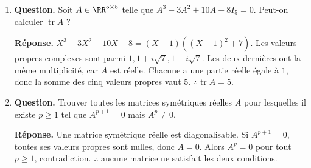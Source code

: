 \documentclass[12pt, a4paper]{article}
\begin{document}
\begin{enumerate}[label=9.\arabic*., start=94]
\begin{minipage}[t]{\linewidth}
\begin{enumerate}[\arabic*.]
$A^2=\beta^2I_n+(n+2\beta)J$ et
        \[
          A^4=\beta^4I_n+(n+2\beta)(n^2+2n\beta+2\beta^2)J
        \]

  \item \textbf{Question.} $A$ est-elle diagonalisable ?
\par\smallskip
\textbf{Réponse.} $A$ est symétrique réelle, donc toujours diagonalisable orthogonalement.
        Sur $\RR\boldsymbol1$, la valeur propre est $n+\beta$ ; sur $\boldsymbol1^\perp$, $A=\beta R$ et les valeurs propres possibles sont $\pm\beta$.

\end{enumerate}
\end{minipage}

  \item \begin{minipage}[t]{\linewidth}\raggedright
\textbf{Question.} Soit $A\in\RR^{5\times5}$ telle que $A^3-3A^2+10A-8I_5=0$. Peut-on calculer $\operatorname{tr}A$ ?
\par\smallskip
\textbf{Réponse.} $X^3-3X^2+10X-8=(X-1)((X-1)^2+7)$.
    Les valeurs propres complexes sont parmi $1,1+i\sqrt7,1-i\sqrt7$.
    Les deux dernières ont la même multiplicité, car $A$ est réelle.
    Chacune a une partie réelle égale à $1$, donc la somme des cinq valeurs propres vaut $5$.
    $\therefore\operatorname{tr}A=5$.
\end{minipage}

  \item \begin{minipage}[t]{\linewidth}\raggedright
\textbf{Question.} Trouver toutes les matrices symétriques réelles $A$ pour lesquelles il existe $p\geq1$ tel que $A^{p+1}=0$ mais $A^p\neq0$.
\par\smallskip
\textbf{Réponse.} Une matrice symétrique réelle est diagonalisable.
    Si $A^{p+1}=0$, toutes ses valeurs propres sont nulles, donc $A=0$.
    Alors $A^p=0$ pour tout $p\geq1$, contradiction.
    $\therefore$ aucune matrice ne satisfait les deux conditions.
\end{minipage}

\end{enumerate}
\end{document}

